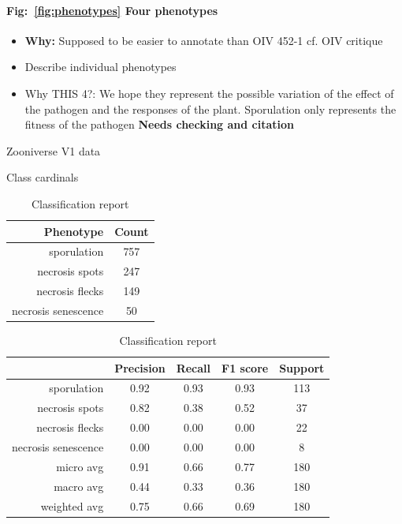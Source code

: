\documentclass[english]{article}
\begin{document}
\paragraph{Fig:~\ref*{fig:phenotypes} Four phenotypes}
\begin{itemize}
        \item \textbf{Why:} Supposed to be easier to annotate than OIV 452-1 cf. OIV critique
	\item Describe individual phenotypes
	\item Why THIS 4?: We hope they represent the possible variation of the effect of the pathogen and the responses of the plant. Sporulation only represents the fitness of the pathogen \textbf{Needs checking and citation}
\end{itemize}

\begin{table}[H]
	\caption{Zooniverse V1 data}\label{tab:zv1data}
	\begin{minipage}{0.4\linewidth}
		\caption{Class cardinals}\label{tab:zoonv1classcardinals}
		\begin{tabular}{rc}
			\toprule
			Phenotype           & Count \\
			\midrule
			sporulation         & 757   \\
			necrosis spots      & 247   \\
			necrosis flecks     & 149   \\
			necrosis senescence & 50    \\
			\bottomrule
		\end{tabular}
	\end{minipage}%
	\begin{minipage}{0.4\linewidth}
		\centering
		\caption{Classification report}\label{tab:zv1mcr}
		\begin{tabular}{rcccc}
			\toprule
			{}                                    & Precision & Recall & F1 score & Support \\
			\midrule
			sporulation                           & 0.92      & 0.93   & 0.93     & 113     \\
			necrosis spots                        & 0.82      & 0.38   & 0.52     & 37      \\
			\rowcolor{red!25} necrosis flecks     & 0.00      & 0.00   & 0.00     & 22      \\
			\rowcolor{red!25} necrosis senescence & 0.00      & 0.00   & 0.00     & 8       \\
			micro avg                             & 0.91      & 0.66   & 0.77     & 180     \\
			macro avg                             & 0.44      & 0.33   & 0.36     & 180     \\
			weighted avg                          & 0.75      & 0.66   & 0.69     & 180     \\
			\bottomrule
		\end{tabular}
	\end{minipage}
\end{table}
\end{document}

